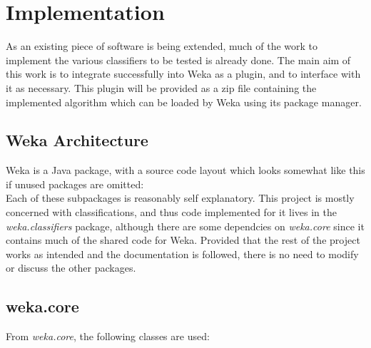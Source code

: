 \section{Implementation}
As an existing piece of software is being extended, much of the work to implement the various classifiers to be tested is already done. The main aim of this work is to integrate successfully into Weka as a plugin, and to interface with it as necessary. This plugin will be provided as a zip file containing the implemented algorithm which can be loaded by Weka using its package manager.
\subsection{Weka Architecture}
Weka is a Java package, with a source code layout which looks somewhat like this if unused packages are omitted: \\
\hfill \break
Each of these subpackages is reasonably self explanatory. This project is mostly concerned with classifications, and thus code implemented for it lives in the \textit{weka.classifiers} package, although there are some dependcies on \textit{weka.core} since it contains much of the shared code for Weka. Provided that the rest of the project works as intended and the documentation is followed, there is no need to modify or discuss the other packages.

\subsection{weka.core}
From \textit{weka.core}, the following classes are used:

